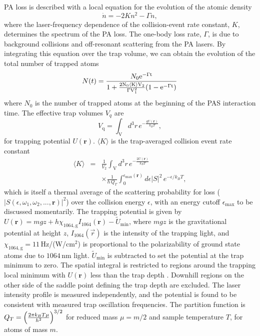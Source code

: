 PA loss is described with a local equation for the evolution of the atomic density
\begin{equation}\label{densitydecay}
	\dot{n}=-2 Kn^2-\Gamma n,
\end{equation}
where the laser-frequency dependence of the collision-event rate constant, $K$, determines the spectrum of the PA loss. The one-body loss rate, $\Gamma$, is due to background collisions and off-resonant scattering from the PA lasers. By integrating this equation over the trap volume, we can obtain the evolution of the total number of trapped atoms
\begin{equation}\label{number}
   N(t)={N_0 \rm{e}^{-\Gamma t} \over 1+
   {2 N_0 \langle K \rangle V_2\over \Gamma V_1^2}(1-\rm{e}^{-\Gamma t})}
\end{equation}
where $N_0$ is the number of trapped atoms at the beginning of the PAS interaction time. The effective trap volumes $V_q$ are 
\begin{equation}\label{eq:effectivevolumes}
	V_{\text{q}}=\int_{\mathrm{V}} d^3r \, e^{-\frac{qU(\mathbf{r})}{k_{B}T}},
\end{equation}
for trapping potential $U(\mathbf{r})$. 
 $\langle K \rangle$ is the trap-averaged collision event rate constant
\begin{eqnarray}\label{equationKeffective}
  \langle K \rangle&=& \frac{1}{V_{2}}\int_{\mathrm{V}} d^3r \,e^{-\frac{2U(\mathbf{r})}{k_{B}T}} \nonumber \\
  &&\times \frac{1}{h\,Q_{T}} \int_{0}^{\epsilon_{\text{max}}({\mathbf{r}})}d\epsilon \vert S\vert^2 \,e^{-\epsilon/k_{B}T},
\end{eqnarray}
which is itself a thermal average of the scattering probability for loss ($\vert S(\epsilon,\omega_1,\omega_2,...,\mathbf{r})\vert^2$) over the collision energy $\epsilon$, with an energy cutoff $\epsilon_{\text{max}}$ to be discussed momentarily. The trapping potential is given by $U(\mathbf{r})=mgz +h\chi_{1064,\text{g}}I_{1064}(\mathbf{r})-\tilde{U}_{\text{min}}$, where $mgz$ is the gravitational potential at height $z$, $I_{1064}(\vec{r})$ is the intensity of the trapping light, and $\chi_{1064,\text{g}}=11$\,Hz/(W/cm$^2$) \cite{YeKatori2008} is proportional to the polarizability of ground state atoms due to $1064$\,nm light. $\tilde{U}_{\text{min}}$ is subtracted to set the potential at the trap minimum to zero. The spatial integral is restricted to regions around the trapping local minimum with $U(\mathbf{r})$ less than the trap depth \cite{ycm11}. Downhill regions on the other side of the saddle point defining the trap depth are excluded. The laser intensity profile is measured independently, and the potential is found to be consistent with measured trap oscillation frequencies. The partition function is $Q_{T}=\left({2\pi k_{B}T \mu \over h^2}\right) ^{3/2}$ for reduced mass $\mu=m/2$ and sample temperature $T$, for atoms of mass $m$.

